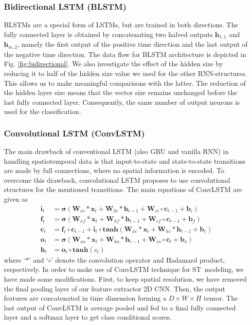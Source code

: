 \documentclass[runningheads]{llncs}
\begin{document}
\subsubsection{Bidirectional LSTM (BLSTM)}
BLSTMs \cite{schuster1997bidirectional} are a special form of LSTMs, but are trained in both directions. The fully connected layer is obtained by concatenating two halved outputs $\bm h_{1,1}$ and $\bm h_{m,2}$, namely the first output of the positive time direction and the last output of the negative time direction. The data flow for BLSTM architecture is depicted in Fig. \ref{fig:bidirectional}. We also investigate the effect of the hidden size by reducing it to half of the hidden size value we used for the other RNN-structures. This allows us to make meaningful comparisons with the latter. The reduction of the hidden layer size means that the vector size remains unchanged before the last fully connected layer. Consequently, the same number of output neurons is used for the classification. 



\subsubsection{Convolutional LSTM (ConvLSTM)}
The main drawback of conventional LSTM (also GRU and vanilla RNN) in handling spatiotemporal data is that input-to-state and state-to-state transitions are made by full connections, where no spatial information is encoded. To overcome this drawback, convolutional LSTM proposes to use convolutional structures for the mentioned transitions. The main equations of ConvLSTM are given as
\begin{align*}
    \bm i_t &= \bm \sigma \left( \bm W_{xi} * \bm x_t + \bm W_{hi} * \bm h_{t-1} + \bm W_{ci} \circ \bm c_{t-1} + \bm b_i \right) \\
    \bm f_t &= \bm \sigma \left( \bm W_{xf} * \bm x_t + \bm W_{hf} * \bm h_{t-1} + \bm W_{cf} \circ \bm c_{t-1} + \bm b_f \right) \\
    \bm c_t &= \bm f_t \circ \bm c_{t-1} + \bm i_t \circ \textbf{tanh}\left(\bm W_{xc} * \bm x_t + \bm W_{hc} * \bm h_{t-1} + \bm b_c \right) \\
    \bm o_t &= \bm \sigma \left( \bm W_{xo} * \bm x_t + \bm W_{ho} * \bm h_{t-1} + \bm W_{co} \circ \bm c_{t} + \bm b_o \right) \\
    \bm h_t &= \bm o_t \circ \textbf{tanh}\left(c_t \right)
\end{align*}
\noindent where `$*$' and `$\circ$' denote the convolution operator and Hadamard product, respectively. In order to make use of ConvLSTM technique for ST~modeling, we have made some modifications. First, to keep spatial resolution, we have removed the final pooling layer of our feature extractor 2D CNN. Then, the output features are concatenated in time dimension forming a $D \times W \times H$ tensor. The last output of ConvLSTM is average pooled and fed to a final fully connected layer and a softmax layer to get class conditional scores.
\end{document}
